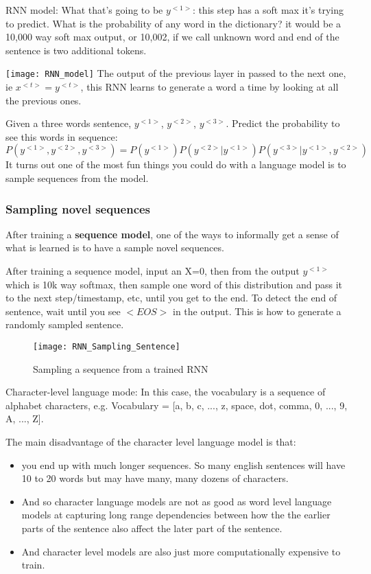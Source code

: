  RNN model:
 What that's going to be $y^{<1>}$: this step has a soft max it's trying to predict. What is the probability of any word in the dictionary? it would be a 10,000 way soft max output, or 10,002, if we call unknown word and end of the sentence is two additional tokens.
 
\texttt{[image: RNN\_model]}
 The output of the previous layer in passed to the next one, ie $x^{<t>}=y^{<t>}$, this RNN learns to generate a word a time by looking at all the previous ones.
 
 Given a three words sentence, $y^{<1>}$, $y^{<2>}$, $y^{<3>}$. Predict the probability to see this words in sequence:
\begin{equation}
 P (y^{<1>}, y^{<2>}, y^{<3>}) = P(y^{<1>}) P(y^{<2>} | y^{<1>}) P(y^{<3>} | y^{<1>}, y^{<2>})
\end{equation}
It turns out one of the most fun things you could do with a language model is to sample sequences from the model. 


\subsubsection{Sampling novel sequences}
After training a \textbf{sequence model}, one of the ways to informally get a sense of what is learned is to have a sample novel sequences.

After training a sequence model, input an X=0, then from the output $y^{<1>}$ which is 10k way softmax, then sample one word of this distribution and pass it to the next step/timestamp, etc, until you get to the end. To detect the end of sentence, wait until you see $<EOS>$ in the output. This is how to generate a randomly sampled sentence.

\begin{figure}[H]
\centering
\texttt{[image: RNN\_Sampling\_Sentence]}
\caption{Sampling a sequence from a trained RNN}
\end{figure}

Character-level language mode:
In this case, the vocabulary is a sequence of alphabet characters, e.g. Vocabulary = [a, b, c, ..., z, space, dot, comma, 0, ..., 9, A, ..., Z].

The main disadvantage of the character level language model is that:
\begin{itemize}
    \item you end up with much longer sequences. So many english sentences will have 10 to 20 words but may have many, many dozens of characters.
    \item And so character language models are not as good as word level language models at capturing long range dependencies between how the the earlier parts of the sentence also affect the later part of the sentence. 
    \item And character level models are also just more computationally expensive to train.
\end{itemize}

